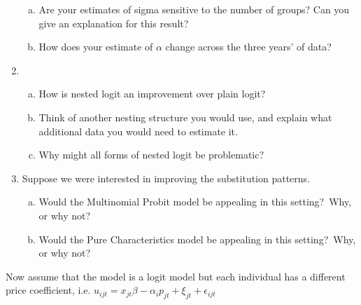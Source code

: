 \documentclass[12pt]{article}
\newcounter{mycounter} %
\begin{document}
\begin{enumerate}
\begin{enumerate}[(a)]
    \item Are your estimates of sigma sensitive to the number of groups? Can you give an explanation for this result?
    \item How does your estimate of $\alpha$ change across the three years' of data?
    \end{enumerate}
\item
    \begin{enumerate}[(a)]
    \item How is nested logit an improvement over plain logit?
    \item Think of another nesting structure you would use, and explain what additional data you would need to estimate it.
    \item Why might all forms of nested logit be problematic?
    \end{enumerate}

\item Suppose we were interested in improving the substitution patterns.
    \begin{enumerate}[(a)]
    \item Would the Multinomial Probit model be appealing in this setting?\ Why, or why not?
    \item Would the Pure Characteristics model be appealing in this setting?\ Why, or why not?
    \end{enumerate}
\setcounter{mycounter}{\value{enumi}}
\end{enumerate}
Now assume that the model is a logit model but each individual has a different price coefficient, i.e. $u_{ijt}=x_{jt}\beta -\alpha _{i}p_{jt}+\xi_{jt}+\epsilon _{ijt}$
\end{document}
